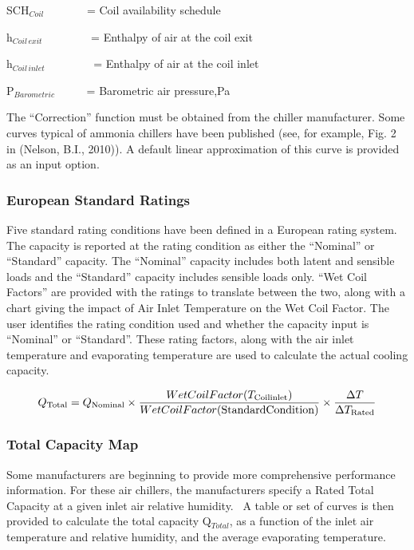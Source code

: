 SCH\(_{Coil}\)~~~~~~~ = Coil availability schedule

h\(_{Coil\, exit}\)~~~~~~~~ = Enthalpy of air at the coil exit

h\(_{Coil\, inlet}\)~~~~~~~~ = Enthalpy of air at the coil inlet

P\(_{Barometric}\)~~~~~ = Barometric air pressure,Pa

The ``Correction'' function must be obtained from the chiller manufacturer. Some curves typical of ammonia chillers have been published (see, for example, Fig. 2 in (Nelson, B.I., 2010)). A default linear approximation of this curve is provided as an input option.

\subsubsection{European Standard Ratings}\label{european-standard-ratings}

Five standard rating conditions have been defined in a European rating system. The capacity is reported at the rating condition as either the ``Nominal'' or ``Standard'' capacity. The ``Nominal'' capacity includes both latent and sensible loads and the ``Standard'' capacity includes sensible loads only. ``Wet Coil Factors'' are provided with the ratings to translate between the two, along with a chart giving the impact of Air Inlet Temperature on the Wet Coil Factor. The user identifies the rating condition used and whether the capacity input is ``Nominal'' or ``Standard''. These rating factors, along with the air inlet temperature and evaporating temperature are used to calculate the actual cooling capacity.

\begin{equation}
{Q_{{\rm{Total}}}} = {Q_{{\rm{Nominal}}}} \times \frac{{WetCoilFactor({T_{{\rm{Coil inlet}}}})}}{{WetCoilFactor({\rm{Standard Condition}})}} \times \frac{{\Delta T}}{{\Delta {T_{{\rm{Rated}}}}}}
\end{equation}

\subsubsection{Total Capacity Map}\label{total-capacity-map}

Some manufacturers are beginning to provide more comprehensive performance information. For these air chillers, the manufacturers specify a Rated Total Capacity at a given inlet air relative humidity.~ A table or set of curves is then provided to calculate the total capacity Q\(_{Total}\), as a function of the inlet air temperature and relative humidity, and the average evaporating temperature.

